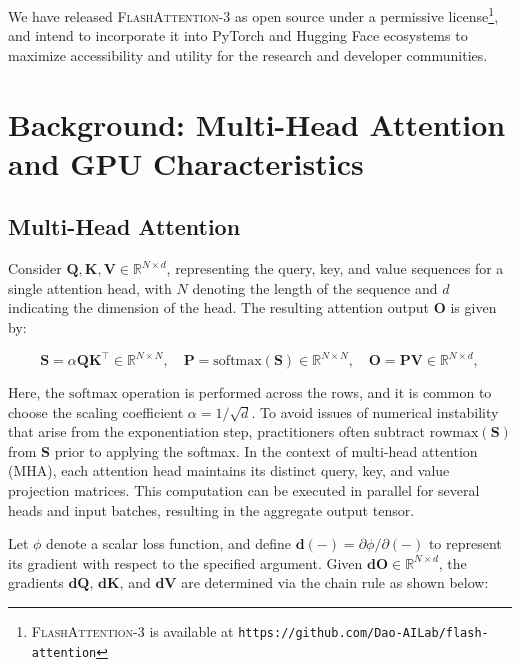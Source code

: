 \begin{enumerate}
We have released \textsc{FlashAttention-3} as open source under a permissive license\footnote{\textsc{FlashAttention-3}
  is available at \texttt{https://github.com/Dao-AILab/flash-attention}}, and intend to incorporate it into PyTorch and Hugging Face ecosystems to maximize accessibility and utility for the research and developer communities.

\section{Background: Multi-Head Attention and GPU Characteristics}
\label{sec:background}

\subsection{Multi-Head Attention}
\label{subsec:multi_head_attn}

Consider $\mathbf{Q}, \mathbf{K}, \mathbf{V} \in \mathbb{R}^{N \times d}$, representing the query, key, and value sequences for a single attention head, with $N$ denoting the length of the sequence and $d$ indicating the dimension of the head. The resulting attention output $\mathbf{O}$ is given by:

\begin{equation*}
  \mathbf{S} = \alpha \mathbf{Q} \mathbf{K}^\top \in \mathbb{R}^{N \times N}, \quad \mathbf{P} = \mathrm{softmax}(\mathbf{S}) \in \mathbb{R}^{N \times N}, \quad \mathbf{O} = \mathbf{P}\mathbf{V} \in \mathbb{R}^{N \times d},
\end{equation*}

Here, the $\mathrm{softmax}$ operation is performed across the rows, and it is common to choose the scaling coefficient $\alpha = 1/\sqrt{d}$. To avoid issues of numerical instability that arise from the exponentiation step, practitioners often subtract $\mathrm{rowmax}(\mathbf{S})$ from $\mathbf{S}$ prior to applying the softmax. In the context of multi-head attention (MHA), each attention head maintains its distinct query, key, and value projection matrices. This computation can be executed in parallel for several heads and input batches, resulting in the aggregate output tensor.

Let $\phi$ denote a scalar loss function, and define $\mathbf{d}(-) = \partial \phi / \partial (-)$ to represent its gradient with respect to the specified argument. Given $\mathbf{dO} \in \mathbb{R}^{N \times d}$, the gradients $\mathbf{dQ}$, $\mathbf{dK}$, and $\mathbf{dV}$ are determined via the chain rule as shown below:


\end{enumerate}
